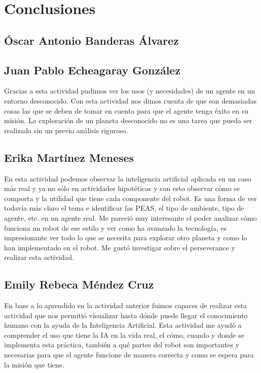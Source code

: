 \documentclass{article}
\begin{document}
    \section{Conclusiones}
        \subsection{Óscar Antonio Banderas Álvarez}

        \subsection{Juan Pablo Echeagaray González}
            Gracias a esta actividad pudimos ver los usos (y necesidades) de un agente en un entorno desconocido. Con esta actividad nos dimos cuenta de que son demasiadas cosas las que se deben de tomar en cuenta para que el agente tenga éxito en su misión. La exploración de un planeta desconocido no es una tarea que pueda ser realizada sin un previo análisis riguroso.

        \subsection{Erika Martínez Meneses}
            En esta actividad podemos observar la inteligencia artificial aplicada en un caso más real y ya no sólo en actividades hipotéticas y con esto observar cómo se comporta y la utilidad que tiene cada componente del robot. Es una forma de ver todavía más claro el tema e identificar las PEAS, el tipo de ambiente, tipo de agente, etc. en un agente real. Me pareció muy interesante el poder analizar cómo funciona un robot de ese estilo y ver como ha avanzado la tecnología, es impresionante ver todo lo que se necesita para explorar otro planeta y como lo han implementado en el robot. Me gustó investigar sobre el perseverance y realizar esta actividad.
            
        \subsection{Emily Rebeca Méndez Cruz}
            En base a lo aprendido en la actividad anterior fuimos capaces de realizar esta actividad que nos permitió visualizar hasta dónde puede llegar el conocimiento humano con la ayuda de la Inteligencia Artificial. Esta actividad me ayudó a comprender el uso que tiene la IA en la vida real, el cómo, cuando y donde se implementa esta práctica, también a qué partes del robot son importantes y necesarias para que el agente funcione de manera correcta y como se espera para la misión que tiene.
            
\end{document}
